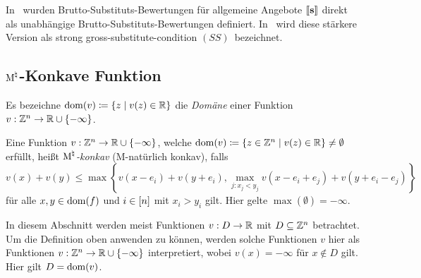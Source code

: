 \begin{bemerkung}
	In~\cite{PaesLeme2018} wurden Brutto-Substituts-Bewertungen für allgemeine Angebote $\left\llbracket \mathbf{s} \right\rrbracket$ direkt als unabhängige Brutto-Substituts-Bewertungen definiert.
	In~\cite{AkiyoshiShioura2015} wird diese stärkere Version als \glqq strong gross-substitute-condition $(SS)$\grqq\ bezeichnet.
\end{bemerkung}

\subsection{$\textrm{\textup{M}}^\natural$-Konkave Funktion}\label{section-m-concavity}

\begin{definition}
	Es bezeichne $\operatorname{dom}(v)\coloneqq \{ z \mid v(z)\in\mathbb{R} \}$ die \emph{Domäne} einer Funktion $v:\mathbb{Z}^n \rightarrow \mathbb{R} \cup \{ -\infty\}$.
\end{definition}


\begin{definition}
	Eine Funktion $v:\mathbb{Z}^n \rightarrow \mathbb{R} \cup \{-\infty\}$, welche $\operatorname{dom}(v) \coloneqq \{ z\in\mathbb{Z}^n \mid v(z) \in \mathbb{R} \}\neq \emptyset$ erfüllt, heißt \emph{$\textrm{\textup{M}}^\natural$-konkav} (\glqq M-natürlich konkav\grqq), falls \[
	v(x) + v(y) \leq
	\max \left\{
		v(x - e_i) + v(y + e_i),
		\max_{j: x_j < y_j} v(x - e_i + e_j) + v(y + e_i - e_j)
	\right\}
	\] für alle $x,y\in\operatorname{dom}(f)$ und $i\in\left[ n \right]$ mit $x_i > y_i$ gilt.
	Hier gelte $\max(\emptyset)=-\infty$.
\end{definition}


In diesem Abschnitt werden meist Funktionen $v: D\rightarrow \mathbb{R}$ mit $D\subseteq \mathbb{Z}^n$ betrachtet.
Um die Definition oben anwenden zu können, werden solche Funktionen $v$ hier als Funktionen $v: \mathbb{Z}^n\rightarrow \mathbb{R} \cup \{ -\infty\}$ interpretiert, wobei $v(x) = -\infty$ für $x\notin D$ gilt.
Hier gilt $D = \operatorname{dom}(v)$.


